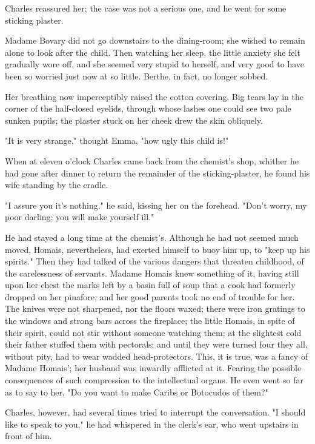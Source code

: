 \documentclass[11pt,twocolumn]{ltugboat}
\begin{document}
Charles reassured her; the case was not a serious one, and he went for
some sticking plaster.

Madame Bovary did not go downstairs to the dining-room; she wished
to remain alone to look after the child. Then watching her sleep, the
little anxiety she felt gradually wore off, and she seemed very stupid
to herself, and very good to have been so worried just now at so little.
Berthe, in fact, no longer sobbed.

Her breathing now imperceptibly raised the cotton covering. Big tears
lay in the corner of the half-closed eyelids, through whose lashes one
could see two pale sunken pupils; the plaster stuck on her cheek drew
the skin obliquely.

"It is very strange," thought Emma, "how ugly this child is!"

When at eleven o'clock Charles came back from the chemist's shop,
whither he had gone after dinner to return the remainder of the
sticking-plaster, he found his wife standing by the cradle.

"I assure you it's nothing." he said, kissing her on the forehead.
"Don't worry, my poor darling; you will make yourself ill."

He had stayed a long time at the chemist's. Although he had not seemed
much moved, Homais, nevertheless, had exerted himself to buoy him up, to
"keep up his spirits." Then they had talked of the various dangers that
threaten childhood, of the carelessness of servants. Madame Homais knew
something of it, having still upon her chest the marks left by a basin
full of soup that a cook had formerly dropped on her pinafore, and
her good parents took no end of trouble for her. The knives were not
sharpened, nor the floors waxed; there were iron gratings to the windows
and strong bars across the fireplace; the little Homais, in spite of
their spirit, could not stir without someone watching them; at the
slightest cold their father stuffed them with pectorals; and until
they were turned four they all, without pity, had to wear wadded
head-protectors. This, it is true, was a fancy of Madame Homais'; her
husband was inwardly afflicted at it. Fearing the possible consequences
of such compression to the intellectual organs. He even went so far as
to say to her, "Do you want to make Caribs or Botocudos of them?"

Charles, however, had several times tried to interrupt the conversation.
"I should like to speak to you," he had whispered in the clerk's ear,
who went upstairs in front of him.
\end{document}
